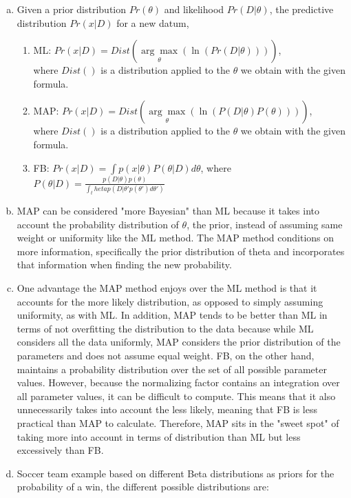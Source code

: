 \documentclass[11pt]{article}
\begin{document}
\begin{enumerate}[a.]
\item Given a prior distribution $Pr(\theta)$ and likelihood $Pr(D|\theta)$, the predictive distribution $Pr(x|D)$ for a new datum,
\begin{enumerate}
\item ML: $Pr(x|D)=Dist(\underset{\theta}{\arg\max}(\ln(Pr(D|\theta))))$, \\where $Dist()$ is a distribution applied to the $\theta$ we obtain with the given formula.
\item MAP: $Pr(x|D)=Dist(\underset{\theta}{\arg\max}(\ln(P(D|\theta)P(\theta))))$, \\where $Dist()$ is a distribution applied to the $\theta$ we obtain with the given formula.
\item FB: $Pr(x|D)=\int p(x|\theta) P(\theta|D)d\theta$, where $P(\theta|D) = \frac{p(D|\theta)p(\theta)}{\int_theta p(D|\theta ' p(\theta ')d\theta ')}$ 
\end{enumerate}
\item MAP can be considered "more Bayesian" than ML because it takes into account the probability distribution of $\theta$, the prior, instead of assuming same weight or uniformity like the ML method. The MAP method conditions on more information, specifically the prior distribution of theta and incorporates that information when finding the new probability. 
\item One advantage the MAP method enjoys over the ML method is that it accounts for the more likely distribution, as opposed to simply assuming uniformity, as with ML. In addition, MAP tends to be better than ML in terms of not overfitting the distribution to the data because while ML considers all the data uniformly, MAP considers the prior distribution of the parameters and does not assume equal weight. FB, on the other hand, maintains a probability distribution over the set of all possible  parameter values. However, because the normalizing factor contains an integration over all parameter values, it can be difficult to compute. This means that it also unnecessarily takes into account the less likely, meaning that FB is less practical than MAP to calculate. Therefore, MAP sits in the "sweet spot" of taking more into account in terms of distribution than ML but less excessively than FB.
\item Soccer team example based on different Beta distributions as priors for the probability of a win, the different possible distributions are:
\begin{itemize}

\end{itemize}
\end{enumerate}
\end{document}

